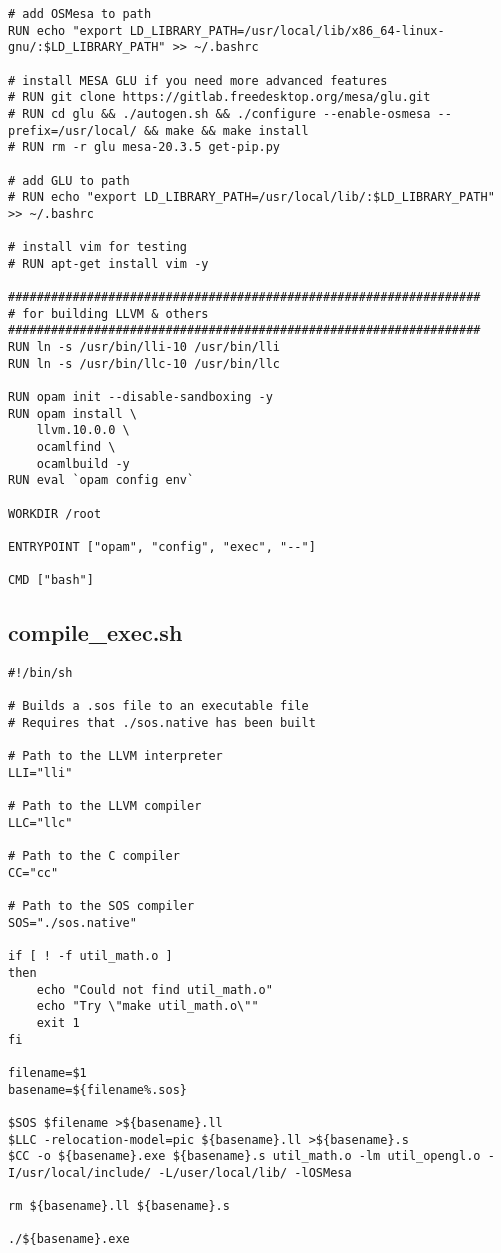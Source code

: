 \documentclass[main.tex]{subfiles}
\begin{document}
\begin{lstlisting}
# add OSMesa to path
RUN echo "export LD_LIBRARY_PATH=/usr/local/lib/x86_64-linux-gnu/:$LD_LIBRARY_PATH" >> ~/.bashrc

# install MESA GLU if you need more advanced features
# RUN git clone https://gitlab.freedesktop.org/mesa/glu.git
# RUN cd glu && ./autogen.sh && ./configure --enable-osmesa --prefix=/usr/local/ && make && make install
# RUN rm -r glu mesa-20.3.5 get-pip.py

# add GLU to path
# RUN echo "export LD_LIBRARY_PATH=/usr/local/lib/:$LD_LIBRARY_PATH" >> ~/.bashrc

# install vim for testing
# RUN apt-get install vim -y

##################################################################
# for building LLVM & others
##################################################################
RUN ln -s /usr/bin/lli-10 /usr/bin/lli
RUN ln -s /usr/bin/llc-10 /usr/bin/llc

RUN opam init --disable-sandboxing -y
RUN opam install \
    llvm.10.0.0 \
    ocamlfind \
    ocamlbuild -y
RUN eval `opam config env`

WORKDIR /root

ENTRYPOINT ["opam", "config", "exec", "--"]

CMD ["bash"]
\end{lstlisting}

\subsection{compile_exec.sh}
\begin{lstlisting}
#!/bin/sh

# Builds a .sos file to an executable file
# Requires that ./sos.native has been built

# Path to the LLVM interpreter
LLI="lli"

# Path to the LLVM compiler
LLC="llc"

# Path to the C compiler
CC="cc"

# Path to the SOS compiler
SOS="./sos.native"

if [ ! -f util_math.o ]
then
    echo "Could not find util_math.o"
    echo "Try \"make util_math.o\""
    exit 1
fi

filename=$1
basename=${filename%.sos}

$SOS $filename >${basename}.ll
$LLC -relocation-model=pic ${basename}.ll >${basename}.s
$CC -o ${basename}.exe ${basename}.s util_math.o -lm util_opengl.o -I/usr/local/include/ -L/user/local/lib/ -lOSMesa

rm ${basename}.ll ${basename}.s

./${basename}.exe
\end{lstlisting}
\end{document}
